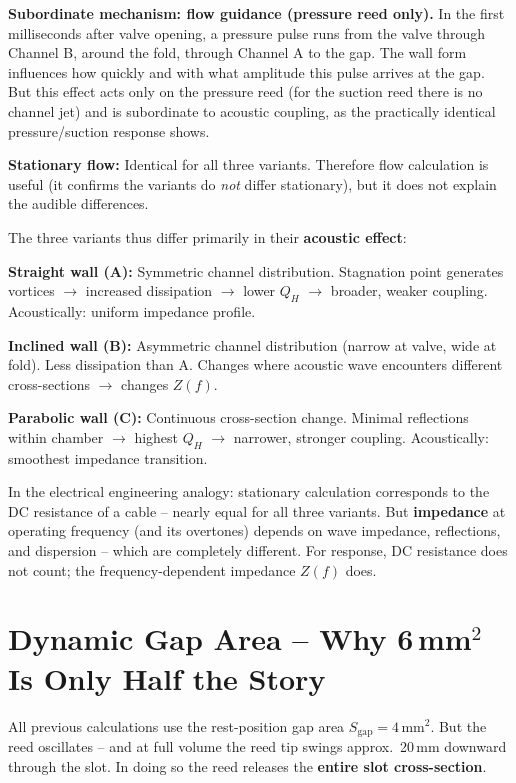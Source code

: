 \documentclass[11pt,a4paper]{article}
\begin{document}
\textbf{Subordinate mechanism: flow guidance (pressure reed only).} In the first milliseconds after valve opening, a pressure pulse runs from the valve through Channel B, around the fold, through Channel A to the gap. The wall form influences how quickly and with what amplitude this pulse arrives at the gap. But this effect acts only on the pressure reed (for the suction reed there is no channel jet) and is subordinate to acoustic coupling, as the practically identical pressure/suction response shows.

\textbf{Stationary flow:} Identical for all three variants. Therefore flow calculation is useful (it confirms the variants do \textit{not} differ stationary), but it does not explain the audible differences.

The three variants thus differ primarily in their \textbf{acoustic effect}:

\textbf{Straight wall (A):} Symmetric channel distribution. Stagnation point generates vortices $\to$ increased dissipation $\to$ lower $Q_H$ $\to$ broader, weaker coupling. Acoustically: uniform impedance profile.

\textbf{Inclined wall (B):} Asymmetric channel distribution (narrow at valve, wide at fold). Less dissipation than A. Changes where acoustic wave encounters different cross-sections $\to$ changes $Z(f)$.

\textbf{Parabolic wall (C):} Continuous cross-section change. Minimal reflections within chamber $\to$ highest $Q_H$ $\to$ narrower, stronger coupling. Acoustically: smoothest impedance transition.

In the electrical engineering analogy: stationary calculation corresponds to the DC resistance of a cable -- nearly equal for all three variants. But \textbf{impedance} at operating frequency (and its overtones) depends on wave impedance, reflections, and dispersion -- which are completely different. For response, DC resistance does not count; the frequency-dependent impedance $Z(f)$ does.

\section[Dynamic Gap Area]{Dynamic Gap Area -- Why 6\,mm$^2$ Is Only Half the Story}

All previous calculations use the rest-position gap area $S_\text{gap} = 4\,\text{mm}^2$. But the reed oscillates -- and at full volume the reed tip swings approx.\ 20\,mm downward through the slot. In doing so the reed releases the \textbf{entire slot cross-section}.
\end{document}
